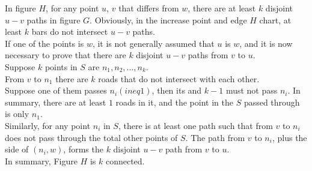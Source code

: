 \documentclass[a4paper, justified]{tufte-handout}
\begin{document}
\begin{problem}[CZ 5.34]
\end{problem}

\begin{solution}
  In figure $H$, for any point $u$, $v$ that differs from $w$, there are at least $k$ disjoint $u-v$ paths in figure $G$. Obviously, in the increase point and edge $H$ chart, at least $k$ bars do not intersect $u-v$ paths. \\
  If one of the points is $w$, it is not generally assumed that $u$ is $w$, and it is now necessary to prove that there are $k$ disjoint $u-v$ paths from $v$ to $u$. \\
  Suppose $k$ points in $S$ are $n_1, n_2,...,n_k$. \\
  From $v$ to $n_1$ there are $k$ roads that do not intersect with each other. \\
  Suppose one of them passes $n_i(ineq 1)$, then its and $k-1$ must not pass $n_i$. In summary, there are at least $1$ roads in it, and the point in the $S$ passed through is only $n_1$. \\
  Similarly, for any point $n_i$ in $S$, there is at least one path such that from $v$ to $n_i$ does not pass through the total other points of $S$.
  The path from $v$ to $n_i$, plus the side of $(n_i,w)$, forms the $k$ disjoint $u-v$ path from $v$ to $u$. \\
  In summary, Figure $H$ is $k$ connected.
\end{solution}

\beginot
\begin{ot}

\end{ot}


\begin{ot}


\end{ot}

\end{document}
